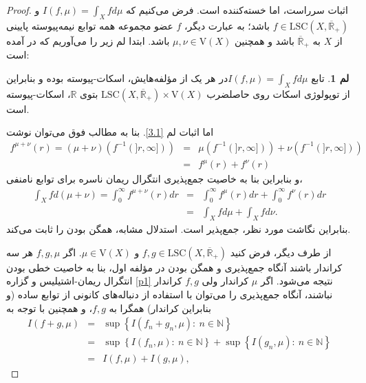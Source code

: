 \documentclass[12pt,a4paper]{article}
\theoremstyle{definition}
\theoremstyle{theorem}
\newtheorem{lemma}[definition]{لم}
\theoremstyle{definition}
\newcommand{\bR}{\mathbb{R}}
\begin{document}
\begin{proof}
اثبات سرراست، اما خسته‌کننده است. فرض می‌کنیم که $ I(f,\mu)=\int_{X}fd\mu $ و
\linebreak
$ f\in \mathrm{LSC}(X,\overline{\mathbb{R}}_{+}) $
باشد؛ به عبارت دیگر، $ f $ عضو مجموعه همه توابع نیمه‌پیوسته پایینی از $ X $ به $ \overline{\mathbb{R}}_{+} $ باشد و همچنین 
$ \mu,\nu\in \mathrm{V}(X)$
باشد.  ابتدا لم زیر را می‌آوریم که در 
\cite{lawson 2}
آمده است:
\begin{lemma}\label{l1} 
تابع $ I(f,\mu)=\int_{X}fd\mu $در هر یک از مؤلفه‌هایش، اسکات-پیوسته بوده و بنابراین از توپولوژی اسکات روی حاصلضرب 
$ \mathrm{LSC}(X,\overline{\mathbb{R}}_{+})\times \mathrm{V}(X) $
بتوی $ \bR $، اسکات-پیوسته است.
\end{lemma}
 اما اثبات لم \ref{3.1}. بنا به مطالب فوق می‌توان نوشت
\begin{eqnarray*}
f^{\mu+\nu}(r)=\left( \mu+\nu\right) \left( f^{-1}\left(]r,\infty]\right) \right)&=&\mu \left( f^{-1}\left(]r,\infty]\right) \right)+\nu \left( f^{-1}\left(]r,\infty]\right) \right)\\
&=&f^{\mu}(r)+f^{\nu}(r)
\end{eqnarray*}
و بنابراین بنا به خاصیت جمع‌پذیری انتگرال ریمان ناسره برای توابع نامنفی، 
\begin{eqnarray*}
\int_{X}fd(\mu+\nu)=\int_{0}^{\infty}f^{\mu+\nu}(r)dr&=&\int_{0}^{\infty}f^{\mu}(r)dr+\int_{0}^{\infty}f^{\nu}(r)dr\\
&=&\int_{X}fd\mu+\int_{X}fd\nu.
\end{eqnarray*}
بنابراین نگاشت مورد نظر، جمع‌پذیر است.  استدلال مشابه،  همگن بودن را ثابت می‌کند.

از طرف دیگر، فرض کنید 
$ f,g\in \mathrm{LSC}(X,\overline{\mathbb{R}}_{+}) $
و
 $ \mu\in\mathrm{V}(X) $. اگر $ f,g,\mu $ هر سه کراندار باشند آنگاه جمع‌پذیری و همگن بودن در مؤلفه اول،
  بنا به خاصیت خطی بودن انتگرال ریمان-اشتیلیس و گزاره \ref{p1} نتیجه می‌شود. اگر $ \mu $ کراندار ولی $ f,g $ کراندار نباشند، آنگاه جمع‌پذیری را می‌توان با استفاده از دنباله‌های کانونی از توابع ساده (و بنابراین کراندار) همگرا به $f,g$، و همچنین با توجه به 
\begin{eqnarray*}
I(f+g,\mu)&=&\sup\left\lbrace I(f_{n}+g_{n},\mu): \ n\in \mathbb{N}\right\rbrace \\
&=&\sup\left\lbrace I(f_{n},\mu): \  n\in \mathbb{N}\right\rbrace+\sup\left\lbrace I(g_{n},\mu): \  n\in \mathbb{N}\right\rbrace\\
&=&I(f,\mu)+I(g,\mu),
\end{eqnarray*}


\end{proof}
\end{document}
